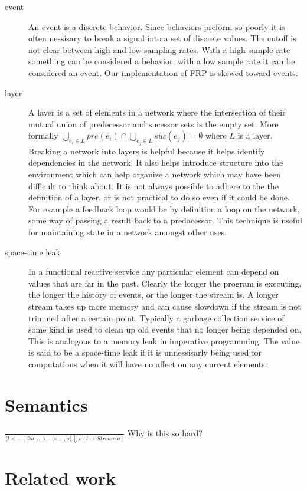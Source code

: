 \documentclass[twocolumn]{paper}
\begin{document}
\begin{description}
\item[event] An event is a discrete behavior. Since behaviors preform so poorly it is often nessisary to break a signal into a set of discrete values. The cutoff is not clear between high and low sampling rates. With a high sample rate something can be considered a behavior, with a low sample rate it can be considered an event. Our implementation of FRP is skewed toward events.

\item[layer] A layer is a set of elements in a network where the intersection of their mutual union of predecessor and sucessor sets is the empty set. More formally $\bigcup_{e_i \in L}{pre(e_i)} \cap \bigcup_{e_j \in L}{suc(e_j)} = \emptyset$ where $L$ is a layer. Breaking a network into layers is helpful because it helps identify dependencies in the network. It also helps introduce structure into the environment which can help organize a network which may have been difficult to think about. It is not always possible to adhere to the the definition of a layer, or is not practical to do so even if it could be done. For example a feedback loop would be by definition a loop on the network, some way of passing a result back to a predacessor. This technique is useful for maintaining state in a network amongst other uses.


\item[space-time leak] In a functional reactive service any particular element can depend on values that are far in the past. Clearly the longer the program is executing, the longer the history of events, or the longer the stream is. A longer stream takes up more memory and can cause slowdown if the stream is not trimmed after a certain point. Typically a garbage collection service of some kind is used to clean up old events that no longer being depended on. This is analogous to a memory leak in imperative programming. The value is said to be a space-time leak if it is unnessisarly being used for computations when it will have no affect on any current elements.
\end{description}
\section{Semantics}

$\frac{}{\langle l<-(@a,...)->...,\sigma \rangle \Downarrow \sigma[l \mapsto Stream ~a]}$ Why is this so hard?

\section{Related work}
\end{document}
